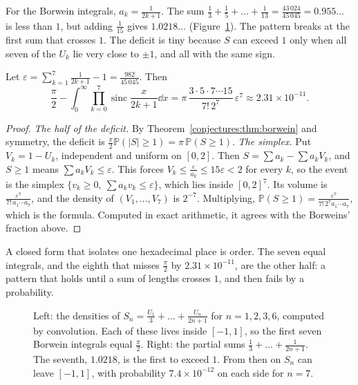 For the Borwein integrals, $a_k=\frac1{2k+1}$. The sum $\frac13+\frac15+\dots+\frac1{13}=\frac{43\,024}{45\,045}=0.955\ldots$ is less than $1$, but adding $\frac1{15}$
gives $1.0218\ldots$ (Figure~\ref{conjectures:fig:borwein}). The pattern breaks at the first sum that crosses $1$. The deficit is tiny because $S$ can exceed $1$ only
when all seven of the $U_k$ lie very close to $\pm1$, and all with the same sign.

\begin{corollary}\label{conjectures:cor:borweindeficit}
Let $\varepsilon=\sum_{k=1}^7\frac1{2k+1}-1=\frac{982}{45\,045}$. Then
\[
\frac\pi2-\int_0^\infty\prod_{k=0}^7\operatorname{sinc}\frac x{2k+1}\dd x=\pi\,\frac{3\cdot5\cdot7\cdots15}{7!\,2^7}\,\varepsilon^7\approx2.31\times10^{-11}.
\]
\end{corollary}
\begin{proof}
\emph{The half of the deficit.}
By Theorem~\ref{conjectures:thm:borwein} and symmetry, the deficit is $\frac\pi2\mathbb P(|S|\ge1)=\pi\,\mathbb P(S\ge1)$.
\emph{The simplex.}
Put $V_k=1-U_k$, independent and uniform on $[0,2]$. Then
$S=\sum a_k-\sum a_kV_k$, and $S\ge1$ means $\sum a_kV_k\le\varepsilon$. This forces $V_k\le\frac\varepsilon{a_k}\le15\varepsilon<2$ for every $k$, so the event is
the simplex $\{v_k\ge0,\ \sum a_kv_k\le\varepsilon\}$, which lies inside $[0,2]^7$. Its volume is $\frac{\varepsilon^7}{7!\,a_1\cdots a_7}$, and the density of
$(V_1,\dots,V_7)$ is $2^{-7}$. Multiplying, $\mathbb P(S\ge1)=\frac{\varepsilon^7}{7!\,2^7a_1\cdots a_7}$, which is the formula. Computed in exact arithmetic, it
agrees with the Borweins' fraction above.
\end{proof}

A closed form that isolates one hexadecimal place is order. The seven equal integrals, and the eighth that misses $\frac\pi2$ by $2.31\times10^{-11}$, are the other half: a pattern that holds until a sum of lengths crosses $1$, and then fails by a probability.

\begin{figure}[ht]
\centering
{}
\caption{Left: the densities of $S_n=\frac{U_1}3+\dots+\frac{U_n}{2n+1}$ for $n=1,2,3,6$, computed by convolution. Each of these lives inside $[-1,1]$, so the first seven
Borwein integrals equal $\frac\pi2$. Right: the partial sums $\frac13+\dots+\frac1{2n+1}$. The seventh, $1.0218$, is the first to exceed $1$. From then on $S_n$
can leave $[-1,1]$, with probability $7.4\times10^{-12}$ on each side for $n=7$.}
\label{conjectures:fig:borwein}
\end{figure}
